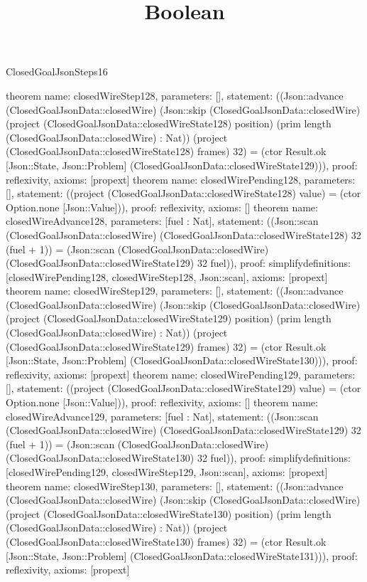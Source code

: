 \begin{lexlean}{ClosedGoalJsonSteps16}
\title{Boolean}
\begin{semanticmodule}
theorem{
 name: closedWireStep128, parameters: [],
 statement: ((Json::advance (ClosedGoalJsonData::closedWire) (Json::skip (ClosedGoalJsonData::closedWire) (project (ClosedGoalJsonData::closedWireState128) position) (prim length (ClosedGoalJsonData::closedWire) : Nat)) (project (ClosedGoalJsonData::closedWireState128) frames) 32) = (ctor Result.ok [Json::State, Json::Problem] (ClosedGoalJsonData::closedWireState129))), proof: reflexivity{}, axioms: [propext]
}
theorem{
 name: closedWirePending128, parameters: [],
 statement: ((project (ClosedGoalJsonData::closedWireState128) value) = (ctor Option.none [Json::Value])), proof: reflexivity{}, axioms: []
}
theorem{
 name: closedWireAdvance128, parameters: [fuel : Nat],
 statement: ((Json::scan (ClosedGoalJsonData::closedWire) (ClosedGoalJsonData::closedWireState128) 32 (fuel + 1)) = (Json::scan (ClosedGoalJsonData::closedWire) (ClosedGoalJsonData::closedWireState129) 32 fuel)), proof: simplify{definitions: [closedWirePending128, closedWireStep128, Json::scan]}, axioms: [propext]
}
theorem{
 name: closedWireStep129, parameters: [],
 statement: ((Json::advance (ClosedGoalJsonData::closedWire) (Json::skip (ClosedGoalJsonData::closedWire) (project (ClosedGoalJsonData::closedWireState129) position) (prim length (ClosedGoalJsonData::closedWire) : Nat)) (project (ClosedGoalJsonData::closedWireState129) frames) 32) = (ctor Result.ok [Json::State, Json::Problem] (ClosedGoalJsonData::closedWireState130))), proof: reflexivity{}, axioms: [propext]
}
theorem{
 name: closedWirePending129, parameters: [],
 statement: ((project (ClosedGoalJsonData::closedWireState129) value) = (ctor Option.none [Json::Value])), proof: reflexivity{}, axioms: []
}
theorem{
 name: closedWireAdvance129, parameters: [fuel : Nat],
 statement: ((Json::scan (ClosedGoalJsonData::closedWire) (ClosedGoalJsonData::closedWireState129) 32 (fuel + 1)) = (Json::scan (ClosedGoalJsonData::closedWire) (ClosedGoalJsonData::closedWireState130) 32 fuel)), proof: simplify{definitions: [closedWirePending129, closedWireStep129, Json::scan]}, axioms: [propext]
}
theorem{
 name: closedWireStep130, parameters: [],
 statement: ((Json::advance (ClosedGoalJsonData::closedWire) (Json::skip (ClosedGoalJsonData::closedWire) (project (ClosedGoalJsonData::closedWireState130) position) (prim length (ClosedGoalJsonData::closedWire) : Nat)) (project (ClosedGoalJsonData::closedWireState130) frames) 32) = (ctor Result.ok [Json::State, Json::Problem] (ClosedGoalJsonData::closedWireState131))), proof: reflexivity{}, axioms: [propext]
}
\end{semanticmodule}
\end{lexlean}
